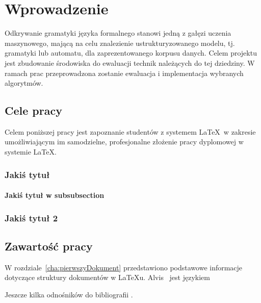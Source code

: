 \chapter{Wprowadzenie}
\label{cha:wprowadzenie}

Odkrywanie gramatyki języka formalnego stanowi jedną z gałęzi uczenia maszynowego, mającą na celu znalezienie ustrukturyzowanego modelu, tj. gramatyki lub automatu, dla zaprezentowanego korpusu danych. Celem projektu jest zbudowanie środowiska do ewaluacji technik należących do tej dziedziny. W ramach prac przeprowadzona zostanie ewaluacja i implementacja wybranych algorytmów.


\section{Cele pracy}
\label{sec:celePracy}


Celem poniższej pracy jest zapoznanie studentów z systemem \LaTeX~w zakresie umożliwiającym im samodzielne, profesjonalne złożenie pracy dyplomowej w systemie \LaTeX.

\subsection{Jakiś tytuł}

\subsubsection{Jakiś tytuł w subsubsection}


\subsection{Jakiś tytuł 2}


\section{Zawartość pracy}
\label{sec:zawartoscPracy}

W rozdziale~\ref{cha:pierwszyDokument} przedstawiono podstawowe informacje dotyczące struktury dokumentów w \LaTeX u. Alvis~\cite{Alvis2011} jest językiem\textellipsis

Jeszcze kilka odnośników do bibliografii \cite{PeDa04,BuDo03}.